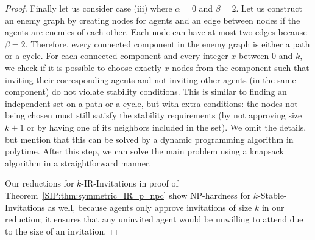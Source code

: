 \begin{proof}
	Finally let us consider case (iii) where $\alpha = 0$ and $\beta = 2$.
	Let us construct an enemy graph by creating nodes for agents and an edge between nodes if the agents are enemies of each other. Each node can have at most two edges because $\beta = 2$.
	Therefore, every connected component in the enemy graph is either a path or a cycle.
	For each connected component and every integer $x$ between $0$ and $k$, we check if it is possible to choose exactly $x$ nodes from the component such that inviting their corresponding agents and not inviting other agents (in the same component) do not violate stability conditions. This is similar to finding an independent set on a path or a cycle, but with extra conditions: the nodes not being chosen must still satisfy the stability requirements (by not approving size $k+1$ or by having one of its neighbors included in the set). We omit the details, but mention that this can be solved by a dynamic programming algorithm in polytime. After this step, we can solve the main problem using a knapsack algorithm in a straightforward manner. 
	
	Our reductions for $k$-IR-Invitations in proof of Theorem~\ref{SIP:thm:symmetric_IR_p_npc} show NP-hardness for $k$-Stable-Invitations as well, because agents only approve invitations of size $k$ in our reduction; it ensures that any uninvited agent would be unwilling to attend due to the size of an invitation.
	
\end{proof}



